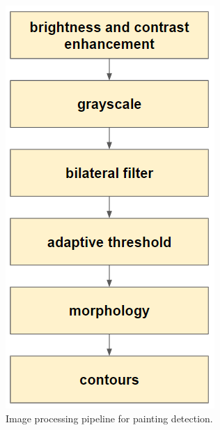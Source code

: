\documentclass[10pt,twocolumn,letterpaper]{article}
\begin{document}
\begin{figure}[t]
\begin{center}
\includegraphics[width=0.6\linewidth]{images/image5.png}
\end{center}
\caption{Image processing pipeline for painting detection.}
\label{fig:PaintingDetectionPipeline}
\end{figure}
\end{document}
